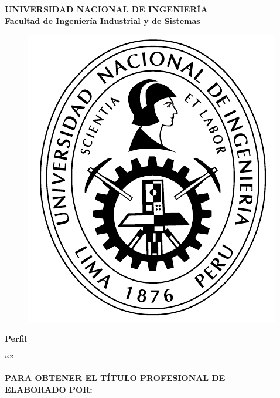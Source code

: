 \begin{titlepage}
	
	\begin{center}
		\vspace*{2 mm}
		{\LARGE \textbf{UNIVERSIDAD NACIONAL DE INGENIERÍA}}\\
		\vspace{5 mm}
		{\LARGE \textbf{Facultad de Ingeniería Industrial y de Sistemas}}\\
		\vspace{6.5 mm}
		\begin{figure}[h]
			\centering 
			\includegraphics[scale=1]{E_IMAGENES/0_Caratula/UNI_LOGO1.pdf}
		\end{figure}
		\vspace{1 mm}	
		{\Large \textbf{Perfil} }\\
		\vspace{5 mm}
		
		\onehalfspacing  %
		{\Large \textbf{``{\@GAAAAA}''} }\\
		
		\singlespacing  %
		
		\vspace{5 mm}	
		{\large \textbf{PARA OBTENER EL TÍTULO PROFESIONAL DE {\@grado} } }\\
		\vspace{10 mm}
		{\large \textbf{ELABORADO POR:} }\\
		\vspace{5 mm}	
	\end{center}

\end{titlepage}
